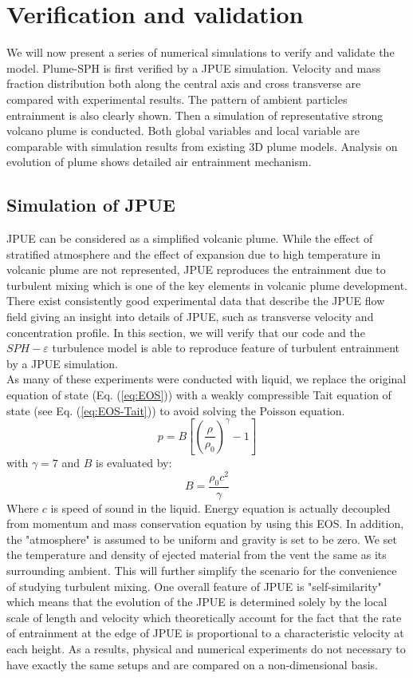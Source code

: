\documentclass[journal abbreviation, manuscript]{copernicus}
\begin{document}
\section{Verification and validation} \label{sec:verification-validation}
We will now present a series of numerical simulations to verify and validate the model. Plume-SPH is first verified by a JPUE simulation. Velocity and mass fraction distribution both along the central axis and cross transverse are compared with experimental results. The pattern of ambient particles entrainment is also clearly shown. Then a simulation of representative strong volcano plume is conducted. Both global variables and local variable are comparable with simulation results from existing 3D plume models. Analysis on evolution of plume shows detailed air entrainment mechanism. 
\subsection{Simulation of JPUE}
JPUE can be considered as a simplified volcanic plume. While the effect of stratified atmosphere and the effect of expansion due to high temperature in volcanic plume are not represented, JPUE reproduces the entrainment due to turbulent mixing which is one of the key elements in volcanic plume development. There exist consistently good experimental data \citep { list1982turbulent,dimotakis1983structure, papanicolaou1988investigations} that describe the JPUE flow field giving an insight into details of JPUE, such as transverse velocity and concentration profile. In this section, we will verify that our code and the $SPH-\varepsilon$ turbulence model is able to reproduce feature of turbulent entrainment by a JPUE simulation.\\
As many of these experiments were conducted with liquid, we replace the original equation of state (Eq. (\ref{eq:EOS})) with a weakly compressible Tait equation of state \citep {becker2007weakly} (see Eq. (\ref{eq:EOS-Tait})) to avoid solving the Poisson equation.
\begin{equation}
p=B[(\dfrac{\rho}{\rho_0})^{\gamma}-1]
\label{eq:EOS-Tait}
\end{equation}
with $\gamma=7$ and $B$ is evaluated by:
\begin{equation}
B=\dfrac{\rho_0 c^2}{\gamma}
\end{equation}
Where $c$ is speed of sound in the liquid. Energy equation is actually decoupled from momentum and mass conservation equation by using this EOS. In addition, the "atmosphere" is assumed to be uniform and gravity is set to be zero. We set the temperature and density of ejected material from the vent the same as its surrounding ambient. This will further simplify the scenario for the convenience of studying turbulent mixing. One overall feature of JPUE is "self-similarity" which means that the evolution of the JPUE is determined solely by the local scale of length and velocity which theoretically account for the fact that the rate of entrainment at the edge of JPUE is proportional to a characteristic velocity at each height. As a results, physical and numerical experiments do not necessary to have exactly the same setups and are compared on a non-dimensional basis.\\
\end{document}
